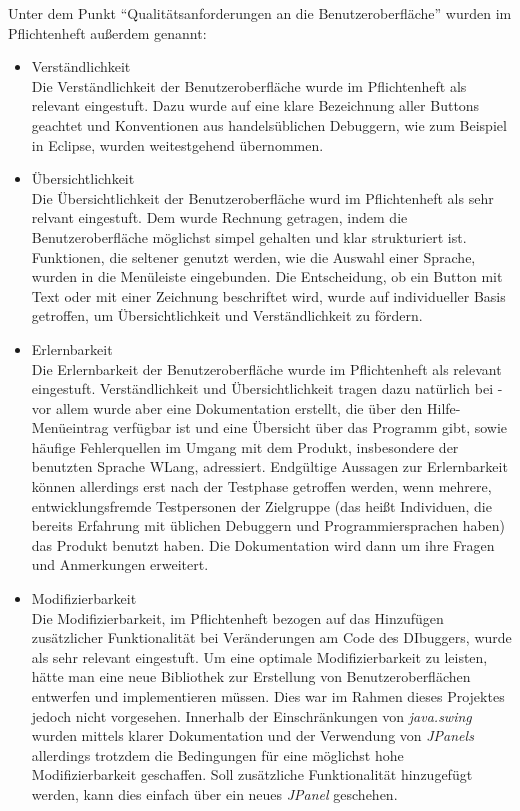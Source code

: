 \documentclass[parskip=full]{scrartcl}
\begin{document}
				Unter dem Punkt \enquote{Qualitätsanforderungen an die Benutzeroberfläche} wurden im Pflichtenheft außerdem genannt:
				\begin{itemize}
				\item Verständlichkeit \\ 
				Die Verständlichkeit der Benutzeroberfläche wurde im Pflichtenheft als relevant eingestuft. Dazu wurde auf eine klare Bezeichnung aller Buttons geachtet und Konventionen aus handelsüblichen Debuggern, wie zum Beispiel in Eclipse, wurden weitestgehend übernommen. 
				\item Übersichtlichkeit \\
				Die Übersichtlichkeit der Benutzeroberfläche wurd im Pflichtenheft als sehr relvant eingestuft. Dem wurde Rechnung getragen, indem die Benutzeroberfläche möglichst simpel gehalten und klar strukturiert ist. Funktionen, die seltener genutzt werden, wie die Auswahl einer Sprache, wurden in die Menüleiste eingebunden. Die Entscheidung, ob ein Button mit Text oder mit einer Zeichnung beschriftet wird, wurde auf individueller Basis getroffen, um Übersichtlichkeit und Verständlichkeit zu fördern.
				\item Erlernbarkeit \\
				Die Erlernbarkeit der Benutzeroberfläche wurde im Pflichtenheft als relevant eingestuft. Verständlichkeit und Übersichtlichkeit tragen dazu natürlich bei - vor allem wurde aber eine Dokumentation erstellt, die über den Hilfe-Menüeintrag verfügbar ist und eine Übersicht über das Programm gibt, sowie häufige Fehlerquellen im Umgang mit dem Produkt, insbesondere der benutzten Sprache WLang, adressiert. Endgültige Aussagen zur Erlernbarkeit können allerdings erst nach der Testphase getroffen werden, wenn mehrere, entwicklungsfremde Testpersonen der Zielgruppe (das heißt Individuen, die bereits Erfahrung mit üblichen Debuggern und Programmiersprachen haben) das Produkt benutzt haben. Die Dokumentation wird dann um ihre Fragen und Anmerkungen erweitert.
				\item Modifizierbarkeit \\
				Die Modifizierbarkeit, im Pflichtenheft bezogen auf das Hinzufügen zusätzlicher Funktionalität bei Veränderungen am Code des DIbuggers, wurde als sehr relevant eingestuft. Um eine optimale Modifizierbarkeit zu leisten, hätte man eine neue Bibliothek zur Erstellung von Benutzeroberflächen entwerfen und implementieren müssen. Dies war im Rahmen dieses Projektes jedoch nicht vorgesehen. Innerhalb der Einschränkungen von \textit{java.swing} wurden mittels klarer Dokumentation und der Verwendung von \textit{JPanels} allerdings trotzdem die Bedingungen für eine möglichst hohe Modifizierbarkeit geschaffen. Soll zusätzliche Funktionalität hinzugefügt werden, kann dies einfach über ein neues \textit{JPanel} geschehen.
				
				\end{itemize}
		
\end{document}
